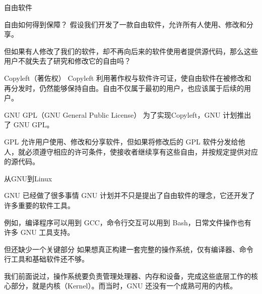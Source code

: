 \documentclass[aspectratio=169]{beamer}
\begin{document}
\begin{frame}{自由软件}
	\begin{block}{自由如何得到保障？}
		\hspace*{2em}假设我们开发了一款自由软件，允许所有人使用、修改和分享。
		\par\hspace*{2em}但如果有人修改了我们的软件，却不再向后来的软件使用者提供源代码，那么这些用户不就失去了研究和修改它的自由吗？
	\end{block}
	\pause
	\begin{block}{Copyleft（著佐权）}
		\hspace*{2em}Copyleft 利用著作权与软件许可证，使自由软件在被修改和再分发时，仍然能够保持自由。\alert{自由不仅属于最初的用户，也应该属于后续的用户。}
	\end{block}
	\pause
	\begin{block}{GNU GPL（GNU General Public License）}
		\hspace*{2em}为了实现Copyleft，GNU 计划推出了 GNU GPL。
		\par\hspace*{2em}GPL 允许用户使用、修改和分享软件，但如果将修改后的 GPL 软件分发给他人，就必须遵守相应的许可条件，使接收者继续享有这些自由，并按规定提供对应的源代码。
	\end{block}	
\end{frame}
\begin{frame}{从GNU到Linux}
	\begin{block}{GNU 已经做了很多事情}
		\hspace*{2em}GNU 计划并不只是提出了自由软件的理念，它还开发了许多重要的软件工具。
		\par\hspace*{2em}例如，编译程序可以用到 GCC，命令行交互可以用到 Bash，日常文件操作也有许多 GNU 工具支持。
	\end{block}
	\pause
	\begin{block}{但还缺少一个关键部分}
		\hspace*{2em}如果想真正构建一套完整的操作系统，仅有编译器、命令行工具和基础软件还不够。
		\par\hspace*{2em}我们前面说过，操作系统要负责管理处理器、内存和设备，完成这些底层工作的核心部分，就是\alert{内核（Kernel）}。而当时，GNU 还没有一个成熟可用的内核。
	\end{block}
\end{frame}
\end{document}
